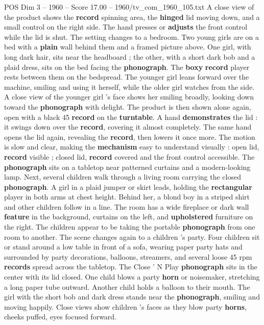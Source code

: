 \begin{textsample}{POS Dim 3 – 1960 – Score 17.00 – 1960/tv\_com\_1960\_105.txt}
A close view of the product shows the \textbf{record} spinning area, the \textbf{hinged} lid moving down, and a small control on the right side.
The hand presses or \textbf{adjusts} the front control while the lid is shut.
The setting changes to a bedroom.
Two young girls are on a bed with a \textbf{plain} wall behind them and a framed picture above.
One girl, with long dark hair, sits near the headboard ; the other, with a short dark bob and a plaid dress, sits on the bed facing the \textbf{phonograph}.
The \textbf{boxy} \textbf{record} player rests between them on the bedspread.
The younger girl leans forward over the machine, smiling and using it herself, while the older girl watches from the side.
A close view of the younger girl ’s face shows her smiling broadly, looking down toward the \textbf{phonograph} with delight.
The product is then shown alone again, open with a black 45 \textbf{record} on the \textbf{turntable}.
A hand \textbf{demonstrates} the lid : it swings down over the \textbf{record}, covering it almost completely.
The same hand opens the lid again, revealing the \textbf{record}, then lowers it once more.
The motion is slow and clear, making the \textbf{mechanism} easy to understand visually : open lid, \textbf{record} visible ; closed lid, \textbf{record} covered and the front control accessible.
The \textbf{phonograph} sits on a tabletop near patterned curtains and a modern-looking lamp.
Next, several children walk through a living room carrying the closed \textbf{phonograph}.
A girl in a plaid jumper or skirt leads, holding the \textbf{rectangular} player in both arms at chest height.
Behind her, a blond boy in a striped shirt and other children follow in a line.
The room has a wide fireplace or dark wall \textbf{feature} in the background, curtains on the left, and \textbf{upholstered} furniture on the right.
The children appear to be taking the portable \textbf{phonograph} from one room to another.
The scene changes again to a children ’s party.
Four children sit or stand around a low table in front of a sofa, wearing paper party hats and surrounded by party decorations, balloons, streamers, and several loose 45 rpm \textbf{records} spread across the tabletop.
The Close ’ N Play \textbf{phonograph} sits in the center with its lid closed.
One child blows a party \textbf{horn} or noisemaker, stretching a long paper tube outward.
Another child holds a balloon to their mouth.
The girl with the short bob and dark dress stands near the \textbf{phonograph}, smiling and moving happily.
Close views show children ’s faces as they blow party \textbf{horns}, cheeks puffed, eyes focused forward.

\end{textsample}
